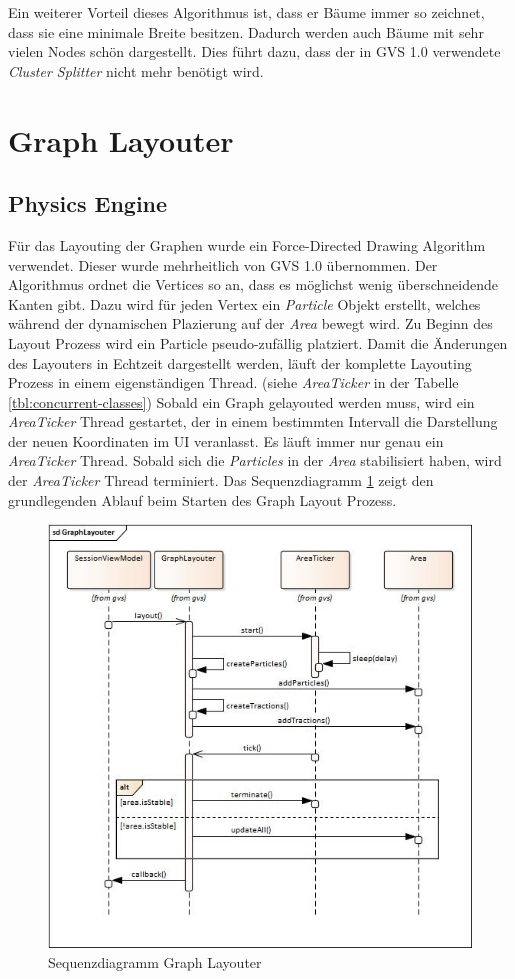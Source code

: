 \documentclass[11pt,a4paper,english,oneside]{book}
\numberwithin{equation}{chapter}
\begin{document}
	\noindent
	Ein weiterer Vorteil dieses Algorithmus ist, dass er Bäume immer so zeichnet, dass sie eine minimale Breite besitzen. Dadurch werden auch Bäume mit sehr vielen Nodes schön dargestellt. Dies führt dazu, dass der in GVS 1.0 \cite{gvs1} verwendete \textit{Cluster Splitter} nicht mehr benötigt wird. 
	
	
	
	\section{Graph Layouter}
	
	\subsection{Physics Engine} \label{ssec:graphlayouter}
	Für das Layouting der Graphen wurde ein Force-Directed Drawing Algorithm verwendet. Dieser wurde mehrheitlich von GVS 1.0 übernommen. Der Algorithmus ordnet die Vertices so an, dass es möglichst wenig überschneidende Kanten gibt. Dazu wird für jeden Vertex ein \textit{Particle} Objekt erstellt, welches während der dynamischen Plazierung auf der \textit{Area} bewegt wird. Zu Beginn des Layout Prozess wird ein Particle pseudo-zufällig platziert. Damit die Änderungen des Layouters in Echtzeit dargestellt werden, läuft der komplette Layouting Prozess in einem eigenständigen Thread. (siehe \textit{AreaTicker} in der Tabelle \ref{tbl:concurrent-classes}) Sobald ein Graph gelayouted werden muss, wird ein \textit{AreaTicker} Thread gestartet, der in einem bestimmten Intervall die Darstellung der neuen Koordinaten im UI veranlasst. Es läuft immer nur genau ein \textit{AreaTicker} Thread. Sobald sich die \textit{Particles} in der \textit{Area} stabilisiert haben, wird der \textit{AreaTicker} Thread terminiert. Das Sequenzdiagramm \ref{fig:sequencegraphlayouter} zeigt den grundlegenden Ablauf beim Starten des Graph Layout Prozess.
	
	\begin{figure}[h!]
		\centering
		\includegraphics[width=0.6\linewidth]{assets/images/sequence_graph_layouter}
		\caption{Sequenzdiagramm Graph Layouter}
		\label{fig:sequencegraphlayouter}
	\end{figure}
	
\end{document}
